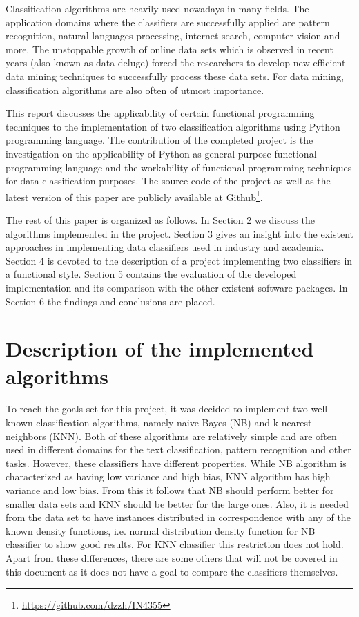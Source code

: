 \documentclass{llncs}
\begin{document}
Classification algorithms are heavily used nowadays in many fields. The application domains where the classifiers are successfully applied are pattern recognition, natural languages processing, internet search, computer vision and more. The unstoppable growth of online data sets which is observed in recent years (also known as data deluge) forced the researchers to develop new efficient data mining techniques to successfully process these data sets. For data mining, classification algorithms are also often of utmost importance.

This report discusses the applicability of certain functional programming techniques to the implementation of two classification algorithms using Python programming language. The contribution of the completed project is the investigation on the applicability of Python as general-purpose functional programming language and the workability of functional programming techniques for data classification purposes. The source code of the project as well as the latest version of this paper are publicly available at Github\footnote{\url{https://github.com/dzzh/IN4355}}.

The rest of this paper is organized as follows. In Section 2 we discuss the algorithms implemented in the project. Section 3 gives an insight into the existent approaches in implementing data classifiers used in industry and academia. Section 4 is devoted to the description of a project implementing two classifiers in a functional style. Section 5 contains the evaluation of the developed implementation and its comparison with the other existent software packages. In Section 6 the findings and conclusions are placed.

\section{Description of the implemented algorithms}

To reach the goals set for this project, it was decided to implement two well-known classification algorithms, namely naive Bayes (NB) and k-nearest neighbors (KNN). Both of these algorithms are relatively simple and are often used in different domains for the text classification, pattern recognition and other tasks. However, these classifiers have different properties. While NB algorithm is characterized as having low variance and high bias, KNN algorithm has high variance and low bias. From this it follows that NB should perform better for smaller data sets and KNN should be better for the large ones. Also, it is needed from the data set to have instances distributed in correspondence with any of the known density functions, i.e. normal distribution density function for NB classifier to show good results. For KNN classifier this restriction does not hold. Apart from these differences, there are some others that will not be covered in this document as it does not have a goal to compare the classifiers themselves. 
\end{document}
